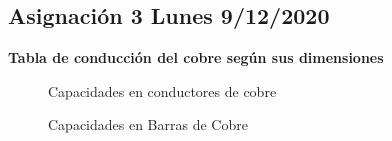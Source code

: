 \documentclass[11pt,letterpaper]{article}
\begin{document}
\subsection{Asignación 3 Lunes 9/12/2020}
\textbf{Tabla de conducción del cobre según sus dimensiones}\\
\begin{figure}[ht!]
	\centering
	\caption{Capacidades en conductores de cobre}
\end{figure}

\begin{figure}[ht!]
	\centering
	\caption{Capacidades en Barras de Cobre}
\end{figure}
 
\end{document}
